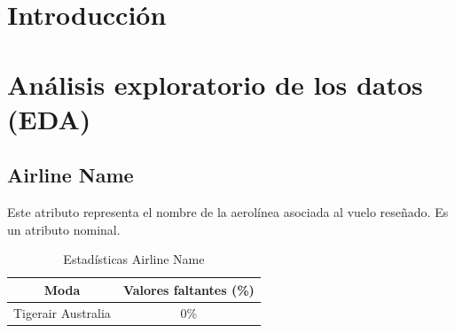 \documentclass[12pt]{report} %
\begin{document}
\newpage %
\thispagestyle{empty}
\mbox{}


\tableofcontents
\thispagestyle{fancy}

\newpage %
\thispagestyle{empty}
\mbox{}

 \listoffigures
 \thispagestyle{fancy}

 \newpage %
 \thispagestyle{empty}
 \mbox{}

\listoftables
 \thispagestyle{fancy}

 \newpage %
 \thispagestyle{empty}
 \mbox{}


\clearpage
{} %

\chapter{Introducción}
\label{chap:intro}

\chapter{Análisis exploratorio de los datos (EDA)}
\label{chap:eda}

    \section{Airline Name}

    Este atributo representa el nombre de la aerolínea asociada al vuelo reseñado.
    Es un atributo nominal.

    \begin{table}[H]
        \begin{center}
            \begin{tabular}{ @{}cc@{} }
                \toprule
                Moda & Valores faltantes (\%) \\
                \midrule
                Tigerair Australia & 0\% \\
                \bottomrule
            \end{tabular}
            \caption{Estadísticas Airline Name}
        \end{center}
    \end{table}
\end{document}
